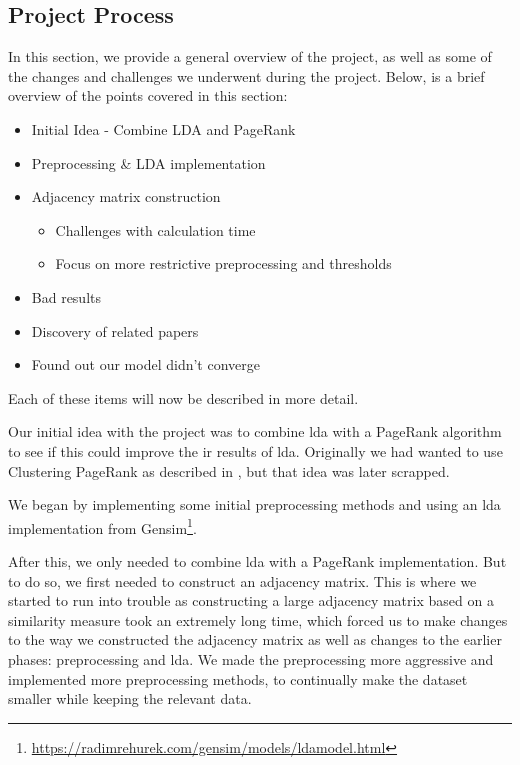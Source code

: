 \subsection{Project Process}
In this section, we provide a general overview of the project, as well as some of the changes and challenges we underwent during the project.
Below, is a brief overview of the points covered in this section:

\begin{itemize}
	\item Initial Idea - Combine LDA and PageRank
	\item Preprocessing \& LDA implementation
	\item Adjacency matrix construction
	\begin{itemize}
		\item Challenges with calculation time
		\item Focus on more restrictive preprocessing and thresholds
	\end{itemize}
	\item Bad results
	\item Discovery of related papers
	\item Found out our model didn't converge
\end{itemize}

Each of these items will now be described in more detail.

Our initial idea with the project was to combine \gls{lda} with a PageRank algorithm to see if this could improve the \acrlong{ir} results of \gls{lda}.
Originally we had wanted to use Clustering PageRank as described in \citeauthor{ClusterPageRank}\cite{ClusterPageRank}, but that idea was later scrapped.

We began by implementing some initial preprocessing methods and using an \gls{lda} implementation from Gensim\footnote{\url{https://radimrehurek.com/gensim/models/ldamodel.html}}.

After this, we only needed to combine \gls{lda} with a PageRank implementation. 
But to do so, we first needed to construct an adjacency matrix.
This is where we started to run into trouble as constructing a large adjacency matrix based on a similarity measure took an extremely long time, which forced us to make changes to the way we constructed the adjacency matrix as well as changes to the earlier phases: preprocessing and \gls{lda}.
We made the preprocessing more aggressive and implemented more preprocessing methods, to continually make the dataset smaller while keeping the relevant data.

